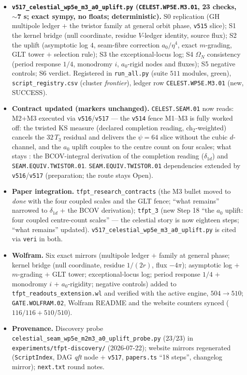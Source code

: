 \begin{itemize}[leftmargin=1.5em]
\item \textbf{\texttt{v517\_celestial\_wp5e\_m3\_a0\_uplift.py} (\texttt{CELEST.WP5E.M3.01},
23 checks, $\sim$7 s; exact sympy, no floats; deterministic).} S0 replication (GH multipole
ledger $+$ the twistor family at general orbit phase, \texttt{v515} slice); S1 the kernel bridge
(null coordinate, residue $V$-ledger identity, source flux); S2 the uplift (asymptotic log $4$,
seam-fibre correction $a_0/\eta^4$, exact $m$-grading, GLT tower $+$ selection rule); S3 the
exceptional-locus log; S4 $\Omega_N$ consistency (period response $1/4$, monodromy $i$, $a_0$-rigid
nodes and fluxes); S5 negative controls; S6 verdict. Registered in \texttt{run\_all.py} (suite
$511$ modules, green), \texttt{script\_registry.csv} (cluster \emph{frontier}), ledger row
\texttt{CELEST.WP5E.M3.01} (new, SUCCESS).
\item \textbf{Contract updated (markers unchanged).} \texttt{CELEST.SEAM.01} now reads: M2$+$M3
executed via \texttt{v516}/\texttt{v517} --- the \texttt{v514} fence M1--M3 is fully worked off:
the twisted KS measure (declared completion reading, ch$_2$-weighted) cancels the $32\,T_3$
residual and delivers the $\psi=64$ slice without the cubic $d$-channel, and the $a_0$ uplift
couples to the centre count on four scales; what stays \mO: the BCOV-integral derivation of the
completion reading ($\delta_{1d}$) and \texttt{SEAM.EQUIV.TWISTOR.01}.
\texttt{SEAM.EQUIV.TWISTOR.01} dependencies extended by \texttt{v516}/\texttt{v517}
(preparation; the route stays Open).
\item \textbf{Paper integration.} \texttt{tfpt\_research\_contracts} (the M3 bullet moved to
\emph{done} with the four coupled scales and the GLT fence; ``what remains'' narrowed to
$\delta_{1d}$ $+$ the BCOV derivation); \texttt{tfpt\_3} (new Step 18 ``the $a_0$ uplift: four
coupled centre-count scales'' --- the celestial story is now eighteen steps; ``what remains''
updated). \texttt{v517\_celestial\_wp5e\_m3\_a0\_uplift.py} is cited via \texttt{veri} in both.
\item \textbf{Wolfram.} Six exact mirrors (multipole ledger $+$ family at general phase; kernel
bridge (null coordinate, residue $1/(2r)$, flux $-4\pi$); asymptotic log $+$ $m$-grading $+$ GLT
tower; exceptional-locus log; period response $1/4$ $+$ monodromy $i$ $+$ $a_0$-rigidity; negative
controls) added to \texttt{tfpt\_readouts\_extension.wl} and verified with the active engine,
$504\to510$; \texttt{GATE.WOLFRAM.02}, Wolfram README and the website counters synced
($116/116+510/510$).
\item \textbf{Provenance.} Discovery probe
\texttt{celestial\_seam\_}\allowbreak\texttt{wp5e\_m2m3\_}\allowbreak\texttt{a0\_uplift\_probe.py}
($23/23$) in \texttt{experiments/tfpt-discovery/} (2026-07-22); website mirrors regenerated
(\texttt{ScriptIndex}, DAG \emph{qft} node $+$ \texttt{v517}, \texttt{papers.ts} ``18 steps'',
changelog mirror); \texttt{next.txt} round notes.
\end{itemize}

